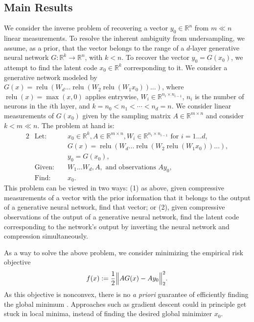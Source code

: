 \documentclass[11pt]{article}
\newcommand{\R}{\mathbb{R}}
\newcommand{\xo}{x_0}
\newcommand{\Win}[1]{W_{#1}}
\newcommand{\Wi}{\Win{i}}
\DeclareMathOperator{\relu}{relu}
\begin{document}
\subsection{Main Results}

We consider the inverse problem of recovering a vector $y_0 \in \R^{n}$ from $m \ll n$ linear measurements. To resolve the inherent ambiguity from undersampling, we assume, as a prior, that the vector belongs to the range of a $d$-layer generative neural network $G: \R^k \to \R^{n}$, with $k<n$.  To recover the vector $y_0= G(\xo)$, we attempt to find the latent code $\xo \in \R^k$ corresponding to it.  
We consider a generative network modeled by $G(x) = \relu(\Win{d} \ldots \relu (\Win{2} \relu(\Win{1} \xo)) \ldots )$, where $\relu(x) = \max(x, 0)$ applies entrywise, $W_i \in \R^{n_i \times n_{i-1}}$, $n_i$ is the number of neurons in the $i$th layer, and $k=n_0 < n_1 < \cdots < n_d = n$.  
 We consider linear measurements of $G(\xo)$ given by the sampling matrix $A \in \R^{m \times n}$ and consider $k < m \ll n$.    The problem at hand is:
\begin{alignat*}{2}
	&\text{Let: } &&\xo \in \R^{k}, A\in \R^{m \times n}, \Wi \in \R^{n_i \times n_{i-1} } \text{ for } i=1\ldots d,\\
	& &&G(x) = \relu(\Win{d} \ldots \relu (\Win{2} \relu(\Win{1} \xo)) \ldots ),\\
	& &&y_0 = G(\xo),\\
	&\text{Given: } && W_1\ldots W_d, A,  \text{  and  observations  } A y_0 ,\\
	&\text{Find: } &&\xo.
\end{alignat*}
This problem can be viewed in two ways: (1) as above, given compressive measurements of a vector with the prior information that it belongs to the output of a generative neural network, find that vector;
or (2), given compressive observations of the output of a generative neural network, find the latent code corresponding to the network's output by inverting the neural network and compression simultaneously.  

As a way to solve the above problem, we consider minimizing the empirical risk objective
\begin{align}
f(x) := \frac{1}{2} \Bigl \| A G(x) - A y_0 \Bigr\|_2^2. \label{defn-f}
\end{align}
As this objective is nonconvex, there is no \textit{a priori} guarantee of efficiently finding the global minimum \cite{Murty1987}.   Approaches such as gradient descent could in principle get stuck in local minima, instead of finding the desired global minimizer $\xo$.  
\end{document}
